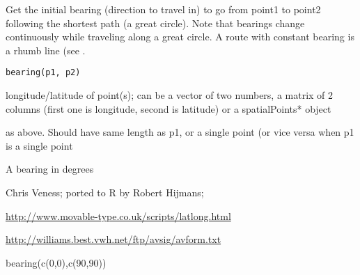 \begin{Description}\relax
Get the initial bearing (direction to travel in) to go from point1 to point2 following the shortest path (a great circle). Note that bearings change continuously while traveling along a great circle. A route with constant bearing is a rhumb line (see .
\end{Description}
\begin{Usage}
\begin{verbatim}
bearing(p1, p2)
\end{verbatim}
\end{Usage}
\begin{Arguments}
\begin{ldescription}
\item[\code{p1}] longitude/latitude of point(s); can be a vector of two numbers, a matrix of 2 columns (first one is longitude, second is latitude) or a spatialPoints* object
\item[\code{p2}] as above. Should have same length as p1, or a single point (or vice versa when p1 is a single point
\end{ldescription}
\end{Arguments}
\begin{Value}
A bearing in degrees
\end{Value}
\begin{Author}\relax
Chris Veness; ported to R by Robert Hijmans;
\end{Author}
\begin{References}\relax
\url{http://www.movable-type.co.uk/scripts/latlong.html}

\url{http://williams.best.vwh.net/ftp/avsig/avform.txt}
\end{References}
\begin{SeeAlso}\relax
{}
\end{SeeAlso}
\begin{Examples}
\begin{ExampleCode}
bearing(c(0,0),c(90,90))
\end{ExampleCode}
\end{Examples}

